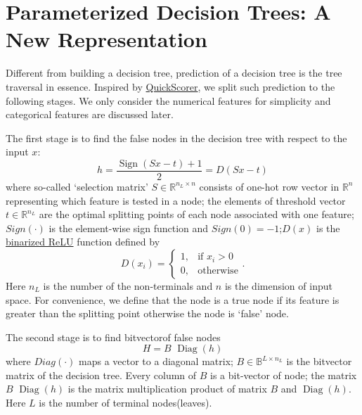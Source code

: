\documentclass[UTF8]{article}
\begin{document}
\section{Parameterized Decision Trees: A New Representation}


Different from building a decision tree, prediction of a decision tree is the tree traversal in essence.
Inspired by \href{http://pages.di.unipi.it/rossano/wp-content/uploads/sites/7/2015/11/sigir15.pdf}{QuickScorer},
we split such prediction to the following stages.
We only consider the numerical features for simplicity and categorical features are discussed later.

The first stage is to  find the false nodes in the decision tree with respect to the input $x$:
   \begin{equation}h=\frac{\operatorname{Sign}(Sx-t)+1}{2}=D(Sx-t)\end{equation}
where so-called `selection matrix' $S\in\mathbb{R}^{n_L\times n}$ consists of one-hot row vector in $\mathbb{R}^n$
representing which feature is tested in a node;
the elements of threshold vector $t\in\mathbb{R}^{n_L}$ are the optimal splitting points of each node associated with one feature;
$Sign(\cdot)$ is the element-wise sign function
and $Sign(0)=-1$;$D(x)$ is the \href{https://arxiv.org/pdf/1901.09731.pdf}{binarized ReLU}\cite{dinh2019convergence} function defined by
$$
D(x_i)=\begin{cases}1, &\text{if $x_i> 0$}\\
0, &\text{otherwise}\end{cases}.
$$
Here $n_L$ is the number of the non-terminals and $n$ is the dimension of input space.
For convenience, we define that the node is a true node if its feature is greater than the splitting point
otherwise the node is `false' node.

The second stage is to find bitvector\footnotemark of false nodes
\begin{equation}H=B\, \,\operatorname{Diag}(h)\end{equation}
where  $Diag(\cdot)$ maps a vector to a diagonal matrix;
$B\in\mathbb{B}^{L\times n_L}$ is the bitvector matrix of the decision tree.
Every column of $B$ is a bit-vector of node; the matrix $B\, \,\operatorname{Diag}(h)$
is the matrix multiplication product of matrix $B$  and $\operatorname{Diag}(h)$.
Here $L$ is the number of terminal nodes(leaves).

\end{document}
